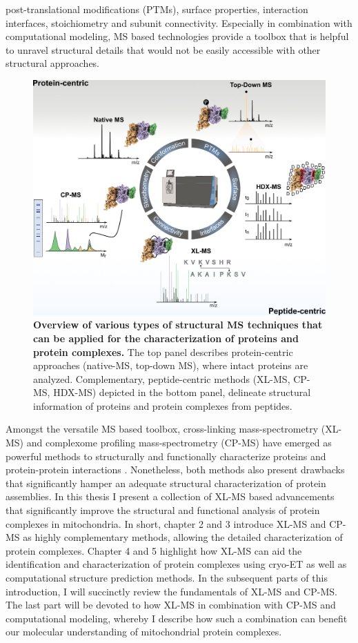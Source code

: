 post-translational modifications (PTMs), surface properties, interaction interfaces, stoichiometry and subunit connectivity. Especially in combination with computational modeling, MS based technologies provide a toolbox that is helpful to unravel structural details that would not be easily accessible with other structural approaches.

\begin{figure}[hbt]
    \center
    \includegraphics[]{Chapter.1/Figures/Figure1.png}
    \caption{\textbf{Overview of various types of structural MS techniques that can be applied for the characterization of proteins and protein complexes.} The top panel describes protein-centric approaches (native-MS, top-down MS), where intact proteins are analyzed. Complementary, peptide-centric methods (XL-MS, CP-MS, HDX-MS) depicted in the bottom panel, delineate structural information of proteins and protein complexes from peptides.}
    \label{fig:fig1}
\end{figure} \clearpage
Amongst the versatile MS based toolbox, cross-linking mass-spectrometry (XL-MS) and complexome profiling mass-spectrometry (CP-MS) have emerged as powerful methods to structurally and functionally characterize proteins and protein-protein interactions \cite{Steigenberger_2020}. Nonetheless, both methods also present drawbacks that significantly hamper an adequate structural characterization of protein assemblies. In this thesis I present a collection of XL-MS based advancements that significantly improve the structural and functional analysis of protein complexes in mitochondria. In short, chapter 2 and 3 introduce XL-MS and CP-MS as highly complementary methods, allowing the detailed characterization of protein complexes. Chapter 4 and 5 highlight how XL-MS can aid the identification and characterization of protein complexes using cryo-ET as well as computational structure prediction methods. In the subsequent parts of this introduction, I will succinctly review the fundamentals of XL-MS and CP-MS. The last part will be devoted to how XL-MS in combination with CP-MS and computational modeling, whereby I describe how such a combination can benefit our molecular understanding of mitochondrial protein complexes.
%
